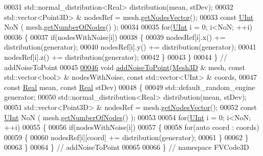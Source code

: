 \begin{DoxyCode}
00031     std::normal\_distribution<Real> distribution(mean, stDev);
00032     std::vector<Point3D> & nodesRef = mesh.\hyperlink{classFVCode3D_1_1Mesh3D_a04162ec60e0fe52674b3ecbb7de1185c}{getNodesVector}();
00033     \textcolor{keyword}{const} \hyperlink{namespaceFVCode3D_a4bf7e328c75d0fd504050d040ebe9eda}{UInt} NoN ( mesh.\hyperlink{classFVCode3D_1_1Mesh3D_a22a32ee29c78d07cbdd033adf61bfa65}{getNumberOfNodes}() );
00034 
00035     \textcolor{keywordflow}{for}(\hyperlink{namespaceFVCode3D_a4bf7e328c75d0fd504050d040ebe9eda}{UInt} i = 0; i<NoN; ++i)
00036     \{
00037         \textcolor{keywordflow}{if}(nodesWithNoise[i])
00038         \{
00039             nodesRef[i].x() += distribution(generator);
00040             nodesRef[i].y() += distribution(generator);
00041             nodesRef[i].z() += distribution(generator);
00042         \}
00043     \}
00044 \} \textcolor{comment}{// addNoiseToPoint}
00045 
\hypertarget{MeshUtility_8cpp_source.tex_l00046}{}\hyperlink{namespaceFVCode3D_a2e19a6aeb189d2ca5370234dd84caa73}{00046} \textcolor{keywordtype}{void} \hyperlink{namespaceFVCode3D_a9f604a7093f7f7323727e7ba28d8ce75}{addNoiseToPoint}(\hyperlink{classFVCode3D_1_1Mesh3D}{Mesh3D} & mesh, \textcolor{keyword}{const} std::vector<bool> & nodesWithNoise, \textcolor{keyword}{const} 
      std::vector<UInt> & coords,
00047     \textcolor{keyword}{const} \hyperlink{namespaceFVCode3D_a40c1f5588a248569d80aa5f867080e83}{Real} mean, \textcolor{keyword}{const} \hyperlink{namespaceFVCode3D_a40c1f5588a248569d80aa5f867080e83}{Real} stDev)
00048 \{
00049     std::default\_random\_engine generator;
00050     std::normal\_distribution<Real> distribution(mean, stDev);
00051     std::vector<Point3D> & nodesRef = mesh.\hyperlink{classFVCode3D_1_1Mesh3D_a04162ec60e0fe52674b3ecbb7de1185c}{getNodesVector}();
00052     \textcolor{keyword}{const} \hyperlink{namespaceFVCode3D_a4bf7e328c75d0fd504050d040ebe9eda}{UInt} NoN ( mesh.\hyperlink{classFVCode3D_1_1Mesh3D_a22a32ee29c78d07cbdd033adf61bfa65}{getNumberOfNodes}() );
00053 
00054     \textcolor{keywordflow}{for}(\hyperlink{namespaceFVCode3D_a4bf7e328c75d0fd504050d040ebe9eda}{UInt} i = 0; i<NoN; ++i)
00055     \{
00056         \textcolor{keywordflow}{if}(nodesWithNoise[i])
00057         \{
00058             \textcolor{keywordflow}{for}(\textcolor{keyword}{auto} coord : coords)
00059             \{
00060                 nodesRef[i][coord] += distribution(generator);
00061             \}
00062         \}
00063     \}
00064 \} \textcolor{comment}{// addNoiseToPoint}
00065 
00066 \} \textcolor{comment}{// namespace FVCode3D}
\end{DoxyCode}
